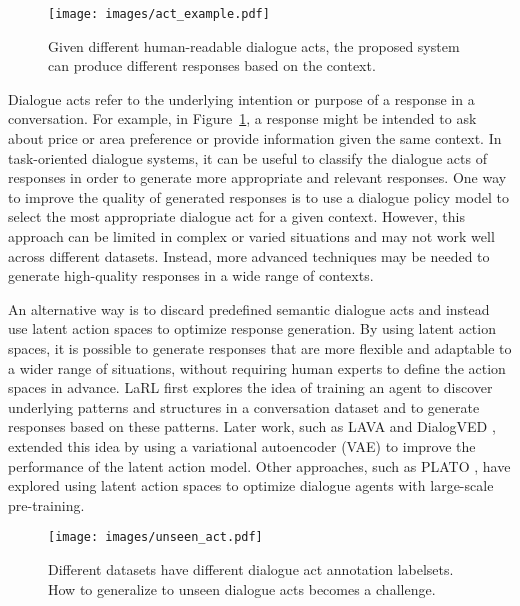 \begin{figure}[t]
    \centering
    \texttt{[image: images/act\_example.pdf]}
    \caption{Given different human-readable dialogue acts, the proposed system can produce different responses based on the context.}
    \label{fig:act_example}
\end{figure}

Dialogue acts refer to the underlying intention or purpose of a response in a conversation. 
For example, in Figure~\ref{fig:act_example}, a response might be intended to ask about price or area preference or provide information given the same context.
In task-oriented dialogue systems, it can be useful to classify the dialogue acts of responses in order to generate more appropriate and relevant responses.
One way \cite{chen2013dialogue} to improve the quality of generated responses is to use a dialogue policy model to select the most appropriate dialogue act for a given context. 
However, this approach can be limited in complex or varied situations and may not work well across different datasets. Instead, more advanced techniques may be needed to generate high-quality responses in a wide range of contexts.

An alternative way is to discard predefined semantic dialogue acts and instead use latent action spaces to optimize response generation.
By using latent action spaces, it is possible to generate responses that are more flexible and adaptable to a wider range of situations, without requiring human experts to define the action spaces in advance.
LaRL \cite{zhao2019rethinking} first explores the idea of training an agent to discover underlying patterns and structures in a conversation dataset and to generate responses based on these patterns.
Later work, such as LAVA \cite{lubis2020lava} and DialogVED \cite{chen-etal-2022-dialogved}, extended this idea by using a variational autoencoder (VAE) to improve the performance of the latent action model.
Other approaches, such as PLATO \cite{bao-etal-2020-plato}, have explored using latent action spaces to optimize dialogue agents with large-scale pre-training.

\begin{figure}[t]
    \centering
    \texttt{[image: images/unseen\_act.pdf]}
    \caption{Different datasets have different dialogue act annotation labelsets. How to generalize to unseen dialogue acts becomes a challenge.}
    \label{fig:unseen_act}
\end{figure}

